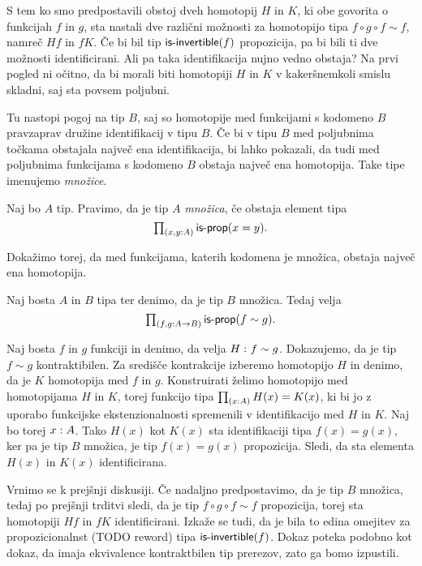 S tem ko smo predpostavili obstoj dveh homotopij \(H\) in \(K\), ki obe govorita o funkcijah \(f\) in \(g\), sta nastali dve različni možnosti za homotopijo tipa \(f \circ g \circ f \sim f\), namreč \(Hf\) in \(fK\). Če bi bil tip \(\textnormal{\textsf{is-invertible}}(f)\) propozicija, pa bi bili ti dve možnosti identificirani. Ali pa taka identifikacija nujno vedno obstaja? Na prvi pogled ni očitno, da bi morali biti homotopiji \(H\) in \(K\) v kakeršnemkoli smislu skladni, saj sta povsem poljubni.

Tu nastopi pogoj na tip \(B\), saj so homotopije med funkcijami s kodomeno \(B\) pravzaprav družine identifikacij v tipu \(B\). Če bi v tipu \(B\) med poljubnima točkama obstajala največ ena identifikacija, bi lahko pokazali, da tudi med poljubnima funkcijama s kodomeno \(B\) obstaja največ ena homotopija. Take tipe imenujemo \emph{množice}.

\begin{definicija}
  Naj bo \(A\) tip. Pravimo, da je tip \(A\) \emph{množica}, če obstaja element tipa
  \[\textstyle \prod_{\left( x, y : A \right)} \textnormal{\textsf{is-prop}}(x = y).\]
\end{definicija}

Dokažimo torej, da med funkcijama, katerih kodomena je množica, obstaja največ ena homotopija.

\begin{trditev}
  \label{is-prop-htpy-set}
  Naj bosta \(A\) in \(B\) tipa ter denimo, da je tip \(B\) množica. Tedaj velja
  \[\textstyle \prod_{\left( f, g : A \to B \right)} \textnormal{\textsf{is-prop}}(f \sim g).\]
\end{trditev}

\begin{dokaz}
  Naj bosta \(f\) in \(g\) funkciji in denimo, da velja \(H \,\colon f \sim g\). Dokazujemo, da je tip \(f \sim g\) kontraktibilen. Za središče kontrakcije izberemo homotopijo \(H\) in denimo, da je \(K\) homotopija med \(f\) in \(g\). Konstruirati želimo homotopijo med homotopijama \(H\) in \(K\), torej funkcijo tipa
  \(\textstyle \prod_{\left( x : A \right)} H(x) = K(x)\), ki bi jo z uporabo funkcijske ekstenzionalnosti spremenili v identifikacijo med \(H\) in \(K\). Naj bo torej \(x : A\).
  Tako \(H(x)\) kot \(K(x)\) sta identifikaciji tipa \(f(x) = g(x)\), ker pa je tip \(B\) množica, je tip \(f(x) = g(x)\) propozicija. Sledi, da sta elementa \(H(x)\) in \(K(x)\) identificirana.
\end{dokaz}

Vrnimo se k prejšnji diskusiji. Če nadaljno predpostavimo, da je tip \(B\) množica, tedaj po prejšnji trditvi sledi, da je tip \(f \circ g \circ f \sim f\) propozicija, torej sta homotopiji \(Hf\) in \(fK\) identificirani. Izkaže se tudi, da je bila to edina omejitev za propozicionalnst (TODO reword) tipa \(\textnormal{\textsf{is-invertible}}(f)\). Dokaz poteka podobno kot dokaz, da imaja ekvivalence kontraktbilen tip prerezov, zato ga bomo izpustili.

